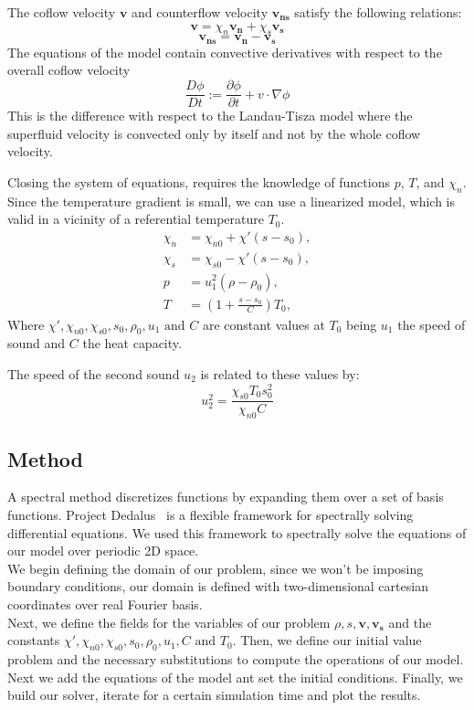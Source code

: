 \documentclass{article}
\begin{document}
The coflow velocity \(\mathbf{v}\) and counterflow velocity \( \mathbf{v_{ns}}\) satisfy the following relations:
\[\mathbf{v} = \chi_n \mathbf{v_n} + \chi_s \mathbf{v_s}\]
\[\mathbf{v_{ns}}  = \mathbf{v_n} - \mathbf{v_s}\]
The equations of the model contain convective derivatives with respect to the overall coflow velocity
\[\frac{D\phi}{Dt} := \frac{\partial \phi}{\partial t} + v \cdot \nabla \phi\]
This is the difference with respect to the Landau-Tisza model where the superfluid velocity is convected only by itself and not by the whole coflow velocity.

Closing the system of equations, requires the knowledge of functions \(p\), \(T\), and \(\chi_n\).
Since the temperature gradient is small, we can use a linearized model, which is valid in a vicinity of a referential temperature \(T_0\).
\begin{align}
    \chi_n &= \chi_{n0} + \chi'(s-s_0),\\
    \chi_s &= \chi_{s0} - \chi'(s-s_0),\\
    p &= u_1^2(\rho-\rho_0), \\
    T &= (1+\frac{s-s_0}{C})T_0,
\end{align}
Where \(\chi', \chi_{n0}, \chi_{s0}, s_0, \rho_0, u_1 \text{ and } C\) are constant values at \(T_0\) being 
\(u_1\) the speed of sound and \(C\) the heat capacity. 

The speed of the second sound \(u_2\) is related to these values by:
\[u_2^2 = \frac{\chi_{s0}T_0s_0^2}{\chi_{n0}C}\]
\subsection{Method}
A spectral method discretizes functions by expanding them over a set of basis functions.
Project Dedalus~\cite{Dedalus} is a flexible framework for spectrally solving differential equations. We used this framework to spectrally solve the equations of our model over periodic 2D space.
\\

We begin defining the domain of our problem, since we won't be imposing boundary conditions, our domain is defined with two-dimensional cartesian coordinates over real Fourier basis.
\\

Next, we define the fields for the variables of our problem \(\rho, s, \mathbf{v}, \mathbf{v_s}\) and the constants \(\chi', \chi_{n0}, \chi_{s0}, s_0, \rho_0, u_1, C \text{ and } T_0\).
Then, we define our initial value problem and the necessary substitutions to compute the operations of our model.
Next we add the equations of the model ant set the initial conditions. 
Finally, we build our solver, iterate for a certain simulation time and plot the results.
\end{document}
